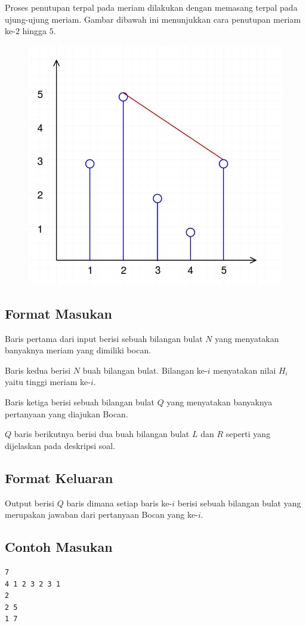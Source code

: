 \documentclass{article}
\begin{document}
\par\noindent Proses penutupan terpal pada meriam dilakukan dengan memasang terpal pada ujung-ujung meriam. Gambar dibawah ini menunjukkan cara penutupan meriam ke-$2$ hingga $5$.

\begin{figure}[h!]
	\centering
	\includegraphics[width=0.2\linewidth]{meriam2.png}
\end{figure}

\subsection*{Format Masukan}

\par\noindent Baris pertama dari input berisi sebuah bilangan bulat $N$ yang menyatakan banyaknya meriam yang dimiliki bocan.
\par\noindent Baris kedua berisi $N$ buah bilangan bulat. Bilangan ke-$i$ menyatakan nilai $H_i$ yaitu tinggi meriam ke-$i$.
\par\noindent Baris ketiga berisi sebuah bilangan bulat $Q$ yang menyatakan banyaknya pertanyaan yang diajukan Bocan.
\par\noindent $Q$ baris berikutnya berisi dua buah bilangan bulat $L$ dan $R$ seperti yang dijelaskan pada deskripsi soal.

\subsection*{Format Keluaran}

\par\noindent Output berisi $Q$ baris dimana setiap baris ke-$i$ berisi sebuah bilangan bulat yang merupakan jawaban dari pertanyaan Bocan yang ke-$i$.

\subsection*{Contoh Masukan}

\begin{lstlisting}
7
4 1 2 3 2 3 1
2
2 5
1 7
\end{lstlisting}
\end{document}

